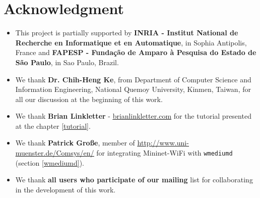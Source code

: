 \chapter{Acknowledgment}

\begin{itemize}
\item This project is partially supported by \textbf{INRIA - Institut National de Recherche en Informatique et en Automatique}, in Sophia Antipolis, France and \textbf{FAPESP - Fundação de Amparo à Pesquisa do Estado de São Paulo}, in Sao Paulo, Brazil.

\item We thank \textbf{Dr. Chih-Heng Ke}, from Department of Computer Science and Information Engineering, National Quemoy University, Kinmen, Taiwan, for all our discussion at the beginning of this work.  

\item We thank \textbf{Brian Linkletter} - \underline{\href{brianlinkletter.com}{brianlinkletter.com}} for the tutorial presented at the chapter \ref{tutorial}.

\item We thank \textbf{Patrick Große}, member of \underline{\href{http://www.uni-muenster.de/Comsys/en/}{http://www.uni-muenster.de/Comsys/en/}} for integrating Mininet-WiFi with \texttt{wmediumd} (section \ref{wmediumd}).

\item We thank \textbf{all users who participate of our mailing} list for collaborating in the development of this work.
\end{itemize}